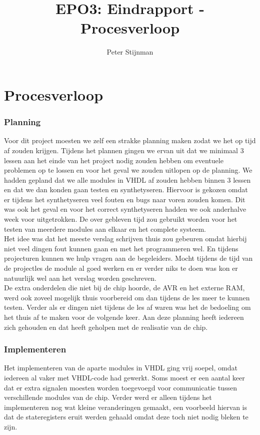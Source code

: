 \documentclass{scrartcl} %
\author{Peter Stijnman}
\title{EPO3: Eindrapport - Procesverloop}
\begin{document}
\chapter{Procesverloop}
\label{ch:procesverloop}

\subsection{ Planning}

Voor dit project moesten we zelf een strakke planning maken zodat we het op tijd af zouden krijgen. Tijdens het plannen gingen we ervan uit dat we minimaal 3 lessen aan het einde van het project nodig zouden hebben om eventuele problemen op te lossen
en voor het geval we zouden uitlopen op de planning. We hadden gepland dat we alle modules in VHDL af zouden hebben binnen 3 lessen en dat we dan konden gaan testen en synthetyseren. Hiervoor is gekozen omdat er tijdens het synthetyseren veel fouten en bugs naar voren zouden komen.
Dit was ook het geval en voor het correct synthetyseren hadden we ook anderhalve week voor uitgetrokken. De over gebleven tijd zou gebruikt worden voor het testen van meerdere modules aan elkaar en het complete systeem.\\
Het idee was dat het meeste verslag schrijven thuis zou gebeuren omdat hierbij niet veel dingen fout kunnen gaan en met het programmeren wel. En tijdens projecturen kunnen we hulp vragen aan de begeleiders. Mocht tijdens de tijd van de projectles de module al goed werken en er verder niks te doen was kon er natuurlijk wel aan het verslag worden geschreven.\\ De extra onderdelen die niet bij de chip hoorde, de AVR en het externe RAM, werd ook zoveel mogelijk thuis voorbereid om dan tijdens de les meer te kunnen testen. Verder als er dingen niet tijdens de les af waren was het de bedoeling om het thuis af te maken voor de volgende keer. Aan deze planning heeft iedereen zich gehouden en dat heeft geholpen met de realisatie van de chip.

\subsection{Implementeren}

Het implementeren van de aparte modules in VHDL ging vrij soepel, omdat iedereen al vaker met VHDL-code had gewerkt. Soms moest er een aantal keer dat er extra signalen moesten worden toegevoegd voor communicatie tussen 
verschillende modules van de chip. Verder werd er alleen tijdens het implementeren nog wat kleine veranderingen gemaakt, een voorbeeld hiervan is dat de stateregisters eruit werden gehaald omdat deze toch niet nodig bleken te zijn. 
\end{document}
